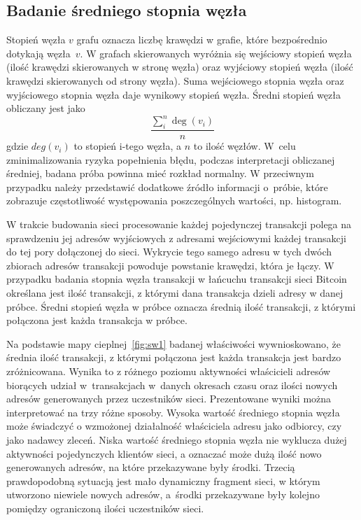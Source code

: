 \documentclass[12pt, twoside, final, openany]{mgr}
\begin{document}
\subsection{Badanie średniego stopnia węzła}
\label{stopien_wezla}
\indent Stopień węzła $v$ grafu oznacza liczbę krawędzi w grafie, które bezpośrednio dotykają węzła~$v$. W grafach skierowanych wyróżnia się wejściowy stopień węzła (ilość krawędzi skierowanych w stronę węzła) oraz wyjściowy stopień węzła (ilość krawędzi skierowanych od strony węzła). Suma wejściowego stopnia węzła oraz wyjściowego stopnia węzła daje wynikowy stopień węzła. Średni stopień węzła obliczany jest jako 
\begin{equation}
\label{eq:stopien_wezla}
  \frac{\sum_i^n\deg(v_i)}{n}
\end{equation} 
gdzie $deg(v_i)$ to stopień i-tego węzła, a $n$ to ilość węzłów\cite{barabasi2016network}. W~celu zminimalizowania ryzyka popełnienia błędu, podczas interpretacji obliczanej średniej, badana próba powinna mieć rozkład normalny. W przeciwnym przypadku należy przedstawić dodatkowe źródło informacji o~próbie, które zobrazuje częstotliwość występowania poszczególnych wartości, np. histogram. 

\indent W trakcie budowania sieci procesowanie każdej pojedynczej transakcji polega na sprawdzeniu jej adresów wyjściowych z adresami wejściowymi każdej transakcji do tej pory dołączonej do sieci. Wykrycie tego samego adresu w tych dwóch zbiorach adresów transakcji powoduje powstanie krawędzi, która je łączy. W przypadku badania stopnia węzła transakcji w łańcuchu transakcji sieci Bitcoin określana jest ilość transakcji, z którymi dana transakcja dzieli adresy w danej próbce. Średni stopień węzła w próbce oznacza średnią ilość transakcji, z którymi połączona jest każda transakcja w próbce. 

\indent Na podstawie mapy cieplnej~\ref{fig:sw1} badanej właściwości wywnioskowano, że średnia ilość transakcji, z którymi połączona jest każda transakcja jest bardzo zróżnicowana. Wynika to z różnego poziomu aktywności właścicieli adresów biorących udział w~transakcjach w~danych okresach czasu oraz ilości nowych adresów generowanych przez uczestników sieci. Prezentowane wyniki można interpretować na trzy różne sposoby. Wysoka wartość średniego stopnia węzła może świadczyć o wzmożonej działalność właściciela adresu jako odbiorcy, czy jako nadawcy zleceń. Niska wartość średniego stopnia węzła nie wyklucza dużej aktywności pojedynczych klientów sieci, a oznaczać może dużą ilość nowo generowanych adresów, na które przekazywane były środki. Trzecią prawdopodobną sytuacją jest mało dynamiczny fragment sieci, w którym utworzono niewiele nowych adresów, a~środki przekazywane były kolejno pomiędzy ograniczoną ilości uczestników sieci.
\end{document}
